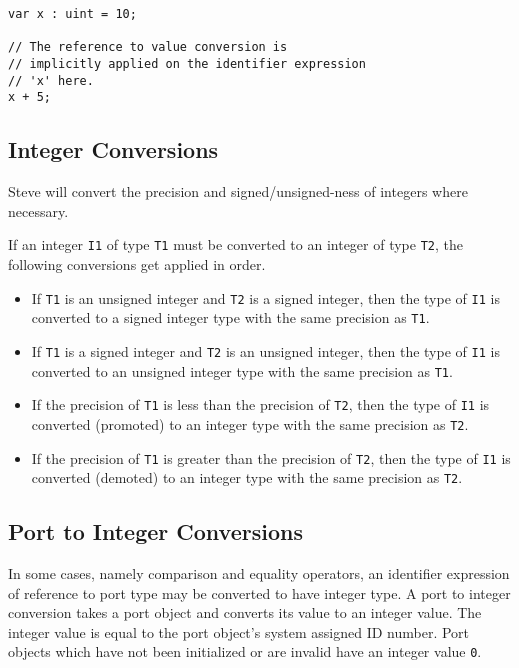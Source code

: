 \noindent\begin{minipage}{\linewidth}
\begin{lstlisting}
var x : uint = 10;

// The reference to value conversion is
// implicitly applied on the identifier expression
// 'x' here.
x + 5;
\end{lstlisting}
\end{minipage}

\subsection{Integer Conversions} \label{int_conv}

Steve will convert the precision and signed/unsigned-ness of integers where necessary.

If an integer \texttt{I1} of type \texttt{T1} must be converted to an integer of type \texttt{T2}, the following conversions get applied in order.

\begin{itemize}
\item If \texttt{T1} is an unsigned integer and \texttt{T2} is a signed integer, then the type of \texttt{I1} is converted to a signed integer type with the same precision as \texttt{T1}.

\item If \texttt{T1} is a signed integer and \texttt{T2} is an unsigned integer, then the type of \texttt{I1} is converted to an unsigned integer type with the same precision as \texttt{T1}.

\item If the precision of \texttt{T1} is less than the precision of \texttt{T2}, then the type of \texttt{I1} is converted (promoted) to an integer type with the same precision as \texttt{T2}.

\item If the precision of \texttt{T1} is greater than the precision of \texttt{T2}, then the type of \texttt{I1} is converted (demoted) to an integer type with the same precision as \texttt{T2}.
\end{itemize}

\subsection{Port to Integer Conversions} \label{port_conv}

In some cases, namely comparison and equality operators, an identifier expression of reference to port type may be converted to have integer type. A port to integer conversion takes a port object and converts its value to an integer value. The integer value is equal to the port object's system assigned ID number. Port objects which have not been initialized or are invalid have an integer value \texttt{0}.

